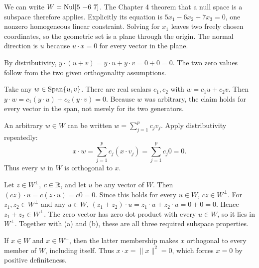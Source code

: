 We can write $W=\operatorname{Nul}[5\ {-6}\ 7]$. The Chapter 4 theorem that
a null space is a subspace therefore applies. Explicitly its equation is
$5x_1-6x_2+7x_3=0$, one nonzero homogeneous linear constraint.
Solving for $x_1$ leaves two freely chosen coordinates, so the geometric
set is a plane through the origin. The normal direction is $u$ because
$u\cdot x=0$ for every vector in the plane.

By distributivity,
$y\cdot(u+v)=y\cdot u+y\cdot v=0+0=0$.
The two zero values follow from the two given orthogonality assumptions.

Take any $w\in\operatorname{Span}\{u,v\}$. There are real scalars $c_1,c_2$
with $w=c_1u+c_2v$. Then
$y\cdot w=c_1(y\cdot u)+c_2(y\cdot v)=0$.
Because $w$ was arbitrary, the claim holds for every vector in the span,
not merely for its two generators.

An arbitrary $w\in W$ can be written $w=\sum_{j=1}^pc_jv_j$.
Apply distributivity repeatedly:
\[
x\cdot w=\sum_{j=1}^pc_j(x\cdot v_j)=\sum_{j=1}^pc_j0=0.
\]
Thus every $w$ in $W$ is orthogonal to $x$.

Let $z\in W^\perp$, $c\in\mathbb{R}$, and let $u$ be any vector of $W$.
Then $(cz)\cdot u=c(z\cdot u)=c0=0$. Since this holds for every
$u\in W$, $cz\in W^\perp$.
For $z_1,z_2\in W^\perp$ and any $u\in W$,
$(z_1+z_2)\cdot u=z_1\cdot u+z_2\cdot u=0+0=0$.
Hence $z_1+z_2\in W^\perp$.
The zero vector has zero dot product with every $u\in W$, so it lies
in $W^\perp$. Together with (a) and (b), these are all three required
subspace properties.

If $x\in W$ and $x\in W^\perp$, then the latter membership makes
$x$ orthogonal to every member of $W$, including itself. Thus
$x\cdot x=\|x\|^2=0$, which forces $x=0$ by positive definiteness.

